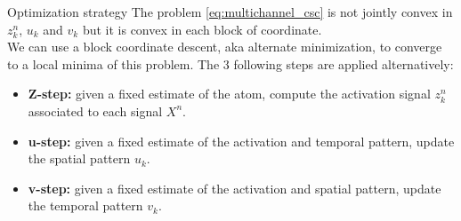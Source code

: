 \documentclass{beamer}
\begin{document}

\begin{frame}{Optimization strategy}
The problem \autoref{eq:multichannel_csc} is not jointly convex in $z^n_k$, $u_k$ and $v_k$ but it is convex in each block of coordinate.\\[1em]

We can use a block coordinate descent, aka alternate minimization, to converge to a local minima of this problem. The 3 following steps are applied alternatively:

\begin{itemize}
	\item \textbf{Z-step:} given a fixed estimate of the atom, compute the activation signal $z^n_k$ associated to each signal $X^n$.
	\item \textbf{u-step:} given a fixed estimate of the activation and temporal pattern, update the spatial pattern $u_k$.
	\item \textbf{v-step:} given a fixed estimate of the activation and spatial pattern, update the temporal pattern $v_k$.
\end{itemize}
\end{frame}
\end{document}
